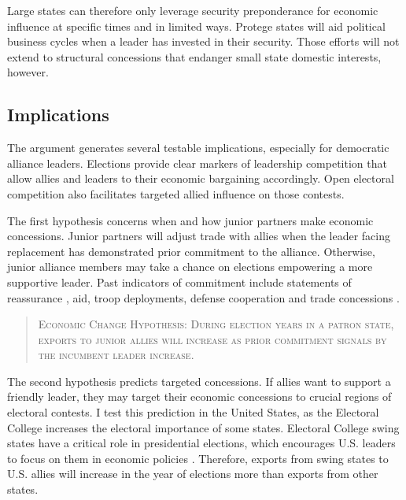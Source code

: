\documentclass[12pt]{article}
\begin{document}
Large states can therefore only leverage security preponderance for economic influence at specific times and in limited ways.
Protege states will aid political business cycles when a leader has invested in their security. 
Those efforts will not extend to structural concessions that endanger small state domestic interests, however.



\subsection{Implications}



The argument generates several testable implications, especially for democratic alliance leaders.
Elections provide clear markers of leadership competition that allow allies and leaders to their economic bargaining accordingly. 
Open electoral competition also facilitates targeted allied influence on those contests. 


The first hypothesis concerns when and how junior partners make economic concessions. 
Junior partners will adjust trade with allies when the leader facing replacement has demonstrated prior commitment to the alliance. 
Otherwise, junior alliance members may take a chance on elections empowering a more supportive leader. 
Past indicators of commitment include statements of reassurance \citep{Blankenship2020}, aid, troop deployments, defense cooperation \citep{Morrow1994, Alley2021isq} and trade concessions \citep{WolfordKim2017}.


\begin{quote}
\textsc{Economic Change Hypothesis: During election years in a patron state, exports to junior allies will increase as prior commitment signals by the incumbent leader increase.}
\end{quote}



The second hypothesis predicts targeted concessions.
If allies want to support a friendly leader, they may target their economic concessions to crucial regions of electoral contests. 
I test this prediction in the United States, as the Electoral College increases the electoral importance of some states.
Electoral College swing states have a critical role in presidential elections, which encourages U.S. leaders to focus on them in economic policies \citep{KrinerReeves2015, Conconietal2017}.
Therefore, exports from swing states to U.S. allies will increase in the year of elections more than exports from other states.
\end{document}
